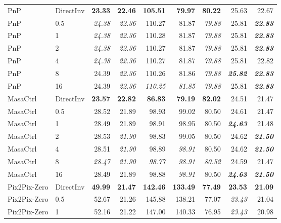 \documentclass{article} %
\begin{document}
\begin{table}[p]
{\begin{tabular}{llrrrrrrr}
    \midrule
    PnP & DirectInv & \textbf{23.33} & \textbf{22.46} & \textbf{105.51} & \textbf{79.97} & \textbf{80.22} & 25.63 & 22.67 \\
    PnP & 0.5 & \textit{24.38} & \textit{22.36} & 110.27 & 81.87 & \textit{79.88} & 25.81 & \textbf{\textit{22.83}} \\
    PnP & 1 & \textit{24.38} & \textit{22.36} & 110.28 & 81.87 & \textit{79.88} & 25.81 & \textbf{\textit{22.83}} \\
    PnP & 2 & \textit{24.38} & \textit{22.36} & 110.27 & 81.87 & \textit{79.88} & 25.81 & \textbf{\textit{22.83}} \\
    PnP & 4 & \textit{24.38} & \textit{22.36} & 110.27 & 81.87 & \textit{79.88} & 25.81 & 22.82 \\
    PnP & 8 & 24.39 & \textit{22.36} & 110.26 & 81.86 & \textit{79.88} & \textbf{\textit{25.82}} & \textbf{\textit{22.83}} \\
    PnP & 16 & 24.39 & \textit{22.36} & \textit{110.25} & \textit{81.85} & \textit{79.88} & 25.81 & \textbf{\textit{22.83}} \\
    \midrule
    MasaCtrl & DirectInv & \textbf{23.57} & \textbf{22.82} & \textbf{86.83} & \textbf{79.19} & \textbf{82.02} & 24.51 & 21.47 \\
    MasaCtrl & 0.5 & 28.52 & 21.89 & 98.93 & 99.02 & 80.50 & 24.61 & 21.47 \\
    MasaCtrl & 1 & 28.49 & 21.89 & 98.91 & 98.95 & 80.50 & \textbf{\textit{24.63}} & 21.48 \\
    MasaCtrl & 2 & 28.53 & \textit{21.90} & 98.83 & 99.05 & 80.50 & 24.62 & \textbf{\textit{21.50}} \\
    MasaCtrl & 4 & 28.51 & \textit{21.90} & 98.89 & \textit{98.91} & 80.50 & 24.62 & \textbf{\textit{21.50}} \\
    MasaCtrl & 8 & \textit{28.47} & \textit{21.90} & \textit{98.77} & \textit{98.91} & \textit{80.52} & 24.59 & 21.47 \\
    MasaCtrl & 16 & 28.49 & 21.89 & 98.88 & \textit{98.91} & 80.50 & \textbf{\textit{24.63}} & \textbf{\textit{21.50}} \\
    \midrule
    Pix2Pix-Zero & DirectInv & \textbf{49.99} & \textbf{21.47} & \textbf{142.46} & \textbf{133.49} & \textbf{77.49} & \textbf{23.53} & \textbf{21.09} \\
    Pix2Pix-Zero & 0.5 & 52.67 & 21.26 & 145.88 & 138.21 & 77.07 & \textit{23.43} & 21.04 \\
    Pix2Pix-Zero & 1 & 52.16 & 21.22 & 147.00 & 140.33 & 76.95 & \textit{23.43} & 20.98 \\

\end{tabular}}
\end{table}
\end{document}
